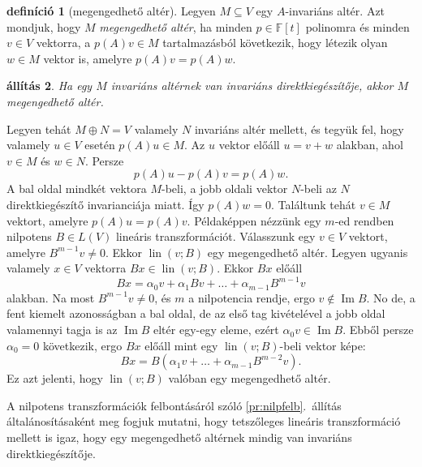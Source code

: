 \documentclass[9pt, a4paper, showtrims]{memoir}
\makeatletter
\renewenvironment{proof}[1][\proofname]
    {\par\pushQED{\qed}%
    \normalfont \topsep6\p@\@plus6\p@\relax
    \trivlist
    \item[\hskip\labelsep
        \itshape
    #1\@addpunct{:}]\ignorespaces}
    {\popQED\endtrivlist\@endpefalse}
\theoremstyle{plain}
\newtheorem{proposition}{állítás}[chapter]
\theoremstyle{remark}
\theoremstyle{definition}
\newtheorem{definition}[proposition]{definíció}
\DeclareMathOperator{\lin}{lin}
\DeclareMathOperator{\im}{Im}
\makeatother
\begin{document}
\begin{definition}[megengedhető altér]
    Legyen $M\subseteq V$ egy $A$-invariáns altér.
    Azt mondjuk, hogy $M$ \emph{megengedhető altér},
    ha minden $p\in\mathbb{F}\left[ t \right]$ polinomra és minden $v\in V$ vektorra,
    a $p\left( A \right)v\in M$ tartalmazásból következik, 
    hogy létezik olyan $w\in M$ vektor is, amelyre $p\left( A \right)v=p\left( A \right)w$.
\end{definition}
\begin{proposition}
    Ha egy $M$ invariáns altérnek van invariáns direktkiegészítője, akkor $M$ megengedhető altér.
\end{proposition}
\begin{proof}
    Legyen tehát $M\oplus N=V$ valamely $N$ invariáns altér mellett,
    és tegyük fel, hogy valamely $u\in V$ esetén $p\left( A \right)u\in M$.
    Az $u$ vektor előáll $u=v+w$ alakban, 
    ahol $v\in M$ és $w\in N$.
    Persze
    \[
        p\left( A \right)u-p\left( A \right)v=p\left( A \right)w.
    \]
    A bal oldal mindkét vektora $M$-beli, 
    a jobb oldali vektor $N$-beli az $N$ direktkiegészítő invarianciája miatt.
    Így $p\left( A \right)w=0$.
    Találtunk tehát $v\in M$ vektort, amelyre $p\left( A \right)u=p\left( A \right)v$.
\end{proof}
Példaképpen nézzünk egy $m$-ed rendben nilpotens 
$B\in L\left( V \right)$ lineáris transzformációt.
Válasszunk egy $v\in V$ vektort, amelyre $B^{m-1}v\neq 0$.
Ekkor $\lin\left( v;B \right)$ egy megengedhető altér.
Legyen ugyanis valamely $x\in V$ vektorra $Bx\in\lin\left( v;B \right)$.
Ekkor $Bx$ előáll
\[
    Bx
    =
    \alpha_0v+\alpha_1Bv+\ldots+\alpha_{m-1}B^{m-1}v
\]
alakban. 
Na most $B^{m-1}v\neq 0$, és $m$ a nilpotencia rendje, ergo $v\notin \im B$. 
No de, a fent kiemelt azonosságban a bal oldal,
de az első tag kivételével a jobb oldal valamennyi tagja is az $\im B$ eltér egy-egy eleme,
ezért $\alpha_0 v\in\im B$. 
Ebből persze $\alpha_0=0$ következik, 
ergo $Bx$ előáll mint egy $\lin\left( v;B \right)$-beli vektor képe:
\[
    Bx
    =B
    \left( 
    \alpha_1v+\ldots+\alpha_{m-1}B^{m-2}v
    \right).
\]
Ez azt jelenti, hogy $\lin\left(v;B  \right)$ valóban egy megengedhető altér.

A nilpotens transzformációk felbontásáról szóló \ref{pr:nilpfelb}.~állítás általánosításaként meg fogjuk mutatni,
hogy tetszőleges lineáris transzformáció mellett is igaz, 
hogy egy megengedhető altérnek mindig van invariáns direktkiegészítője.
\end{document}
